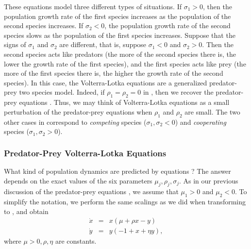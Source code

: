 \documentclass{ximera}
\begin{document}
These equations model three different types of situations.  If
$\sigma_1>0$, then the population growth rate of the first species 
increases as the population of the second species increases.  If
$\sigma_2<0$, the population growth rate of the second species
slows as the population of the first species increases.
Suppose that the signs of $\sigma_1$ and $\sigma_2$ are
different, that is, suppose $\sigma_1<0$ and $\sigma_2>0$.  Then
the second species acts like predators (the more of the second
species there is, the lower the growth rate of the first
species), and the first species acts like prey (the more of
the first species there is, the higher the growth rate of the
second species).  In this case, the Volterra-Lotka equations are
a generalized predator-prey two species model.  Indeed,
if $\rho_1=\rho_2=0$ in , then we recover the
predator-prey equations .  Thus, we may think of
Volterra-Lotka equations as a small perturbation of the 
predator-prey equations when $\rho_1$ and $\rho_2$ are small.
The two other cases in  correspond to {\em competing\/} 
species ($\sigma_1,\sigma_2<0$) and 
{\em cooperating\/} species
($\sigma_1,\sigma_2>0$).


\subsubsection*{Predator-Prey Volterra-Lotka Equations}

What kind of population dynamics are predicted by equations
?  The answer depends on the exact values of the 
six parameters $\mu_j,\rho_j,\sigma_j$.  As in our previous
discussion of the predator-prey equations , we assume
that $\mu_1>0$ and $\mu_2<0$.  To simplify the notation, we
perform the same scalings as we did when transforming  
to , and obtain
\begin{eqnarray*} 
\dot{x} & = & x(\mu + \rho x -       y) \\
\dot{y} & = & y( -1 +       x + \eta y),
\end{eqnarray*}
where $\mu>0,\rho,\eta$ are constants.  
\end{document}
